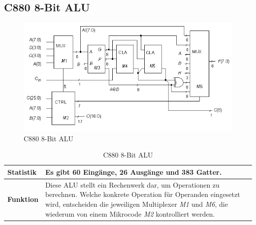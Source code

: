\subsection*{C880 8-Bit ALU}
\label{sec:c880}
\begin{figure}[bth]
	\centering
	\includegraphics[scale=0.6]{./img/c880}
	\caption[C880 8-Bit ALU]{C880 8-Bit ALU \cite{h1999}}
	\label{fig:c880}
\end{figure}
\begin{table}[bth]
	\centering
	\caption{C880 8-Bit ALU}
	\label{tab:c880}
	\begin{tabular}{ | p{2cm} | p{12cm} |}
		\hline
		\textbf{Statistik} & Es gibt 60 Eingänge, 26 Ausgänge und 383 Gatter. \\\hline
		\textbf{Funktion} & Diese ALU stellt ein Rechenwerk dar, um Operationen zu berechnen. Welche konkrete Operation für Operanden eingesetzt wird, entscheiden die jeweiligen Multiplexer \emph{M1} und \emph{M6}, die wiederum von einem Mikrocode \emph{M2} kontrolliert werden.\\\hline
	\end{tabular}
\end{table}
\newpage
